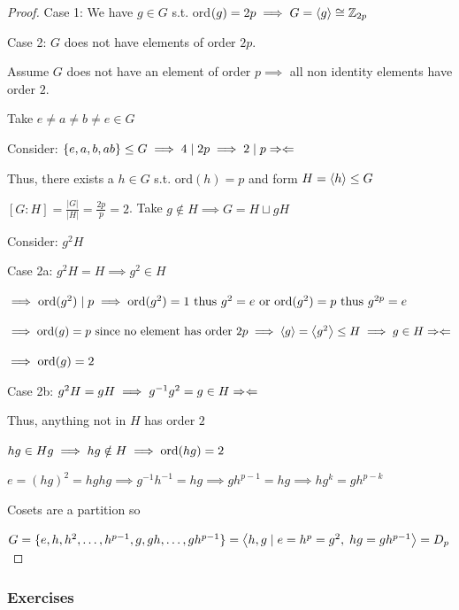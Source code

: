 \begin{proof}
    \phantom{text}

    Case 1: We have $g \in G$ s.t. ord$(g)=2p\implies G=\left\langle g \right\rangle\cong \mathbb{Z}_{2p}$

    Case 2: $G$ does not have elements of order $2p$.

    Assume $G$ does not have an element of order $p \implies$ all non identity elements have order $2$.

    Take $e\neq a \neq b \neq e \in G$

    Consider: $\left\{ e,a,b,ab \right\}\leq G \implies 4 \mid 2p \implies 2 \mid p \Rightarrow \Leftarrow$

    Thus, there exists a $h \in G$ s.t. ord$(h)=p$ and form $H=\left\langle h \right\rangle\leq G$

    $[G:H]=\frac{|G|}{|H|}=\frac{2p}{p}=2$. Take $g \notin H \implies G=H \sqcup gH$

    Consider: $g^2H$

    Case 2a: $g^2H=H \implies g^2 \in H$

    $\implies \text{ord}(g^2)\mid p\implies \text{ord}(g^2)=1 \text{ thus } g^2=e \text{ or } \text{ord}(g^2)=p \text{ thus } g^{2p}=e$ 
    
    $\implies \text{ord}(g)=p \text{ since no element has order }2p\implies \left\langle g \right\rangle=\left\langle g^2 \right\rangle \leq H \implies g \in H \Rightarrow \Leftarrow$

    $\implies \text{ord}(g)=2$

    Case 2b: $g^2H=gH \implies g^{-1}g^2=g \in H \Rightarrow \Leftarrow$

    Thus, anything not in $H$ has order $2$

    $hg \in Hg \implies hg \notin H \implies \text{ord}(hg)=2$

    $e=(hg)^2=hghg \implies g^{-1}h^{-1}=hg \implies gh^{p-1}=hg \implies hg^{k}=gh^{p-k}$

    Cosets are a partition so 
    
    $G=\{e,h,h^2,\ldots,h^{p-1},g,gh,\ldots,gh^{p-1}\}=\left\langle h,g\mid e=h^p=g^2,\; hg=gh^{p-1} \right\rangle=D_p$
\end{proof}

\newpage
\subsubsection{Exercises}

